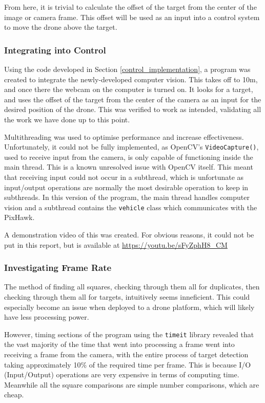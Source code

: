 \documentclass[11pt]{article}
\begin{document}
From here, it is trivial to calculate the offset of the target from the center of the image or camera frame. This offset will be used as an input into a control system to move the drone above the target.

\subsubsection{Integrating into Control}
Using the code developed in Section \ref{control_implementation}, a program was created to integrate the newly-developed computer vision. This takes off to 10m, and once there the webcam on the computer is turned on. It looks for a target, and uses the offset of the target from the center of the camera as an input for the desired position of the drone. This was verified to work as intended, validating all the work we have done up to this point.

Multithreading was used to optimise performance and increase effectiveness. Unfortunately, it could not be fully implemented, as OpenCV's \lstinline|VideoCapture()|, used to receive input from the camera, is only capable of functioning inside the main thread. This is a known unresolved issue with OpenCV itself. This meant that receiving input could not occur in a subthread, which is unfortunate as input/output operations are normally the most desirable operation to keep in subthreads. In this version of the program, the main thread handles computer vision and a subthread contains the \lstinline|vehicle| class which communicates with the PixHawk.

A demonstration video of this was created. For obvious reasons, it could not be put in this report, but is available at \url{https://youtu.be/sFyZphH8_CM}

\subsubsection{Investigating Frame Rate}
The method of finding all squares, checking through them all for duplicates, then checking through them all for targets, intuitively seems inneficient. This could especially become an issue when deployed to a drone platform, which will likely have less processing power.

However, timing sections of the program using the \lstinline|timeit| library revealed that the vast majority of the time that went into processing a frame went into receiving a frame from the camera, with the entire process of target detection taking approximately 10\% of the required time per frame. This is because I/O (Input/Output) operations are very expensive in terms of computing time. Meanwhile all the square comparisons are simple number comparisons, which are cheap.
\end{document}
